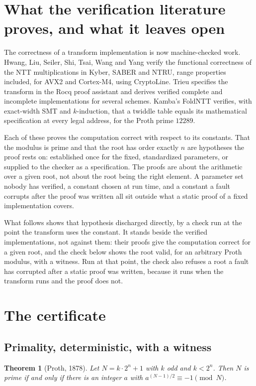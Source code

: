 \documentclass{article}
\newtheorem{theorem}{Theorem}
\begin{document}
\section{What the verification literature proves, and what it leaves open}

The correctness of a transform implementation is now machine-checked work. Hwang, Liu, Seiler, Shi, Tsai, Wang and Yang verify the functional correctness of the NTT multiplications in Kyber, SABER and NTRU, range properties included, for AVX2 and Cortex-M4, using CryptoLine. Trieu specifies the transform in the Rocq proof assistant and derives verified complete and incomplete implementations for several schemes. Kamba's FoldNTT verifies, with exact-width SMT and \(k\)-induction, that a twiddle table equals its mathematical specification at every legal address, for the Proth prime \(12289\).

Each of these proves the computation correct with respect to its constants. That the modulus is prime and that the root has order exactly \(n\) are hypotheses the proof rests on: established once for the fixed, standardized parameters, or supplied to the checker as a specification. The proofs are about the arithmetic over a given root, not about the root being the right element. A parameter set nobody has verified, a constant chosen at run time, and a constant a fault corrupts after the proof was written all sit outside what a static proof of a fixed implementation covers.

What follows shows that hypothesis discharged directly, by a check run at the point the transform uses the constant. It stands beside the verified implementations, not against them: their proofs give the computation correct for a given root, and the check below shows the root valid, for an arbitrary Proth modulus, with a witness. Run at that point, the check also refuses a root a fault has corrupted after a static proof was written, because it runs when the transform runs and the proof does not.

\section{The certificate}

\subsection{Primality, deterministic, with a witness}

\begin{theorem}[Proth, 1878]
Let \(N = k \cdot 2^n + 1\) with \(k\) odd and \(k < 2^n\). Then \(N\) is prime if and only if there is an integer \(a\) with \(a^{(N-1)/2} \equiv -1 \pmod N\).
\end{theorem}
\end{document}
